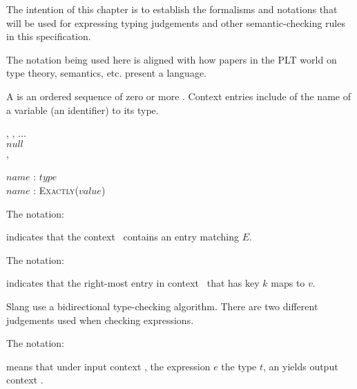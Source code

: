 
\begin{TODO}
The intention of this chapter is to establish the formalisms and notations that will be used for expressing typing judgements and other semantic-checking rules in this specification.

The notation being used here is aligned with how papers in the PLT world on type theory, semantics, etc. present a language.




\end{TODO}


A  is an ordered sequence of zero or more .
Context entries include  of the name of a variable (an identifier) to its type.

\begin{Syntax}
        \ContextVarA, \ContextVarB, ...  \\
        \SynOr $null$  \\
        \SynOr {}, 

        $name$ : $type$  \\
        \SynOr $name$ :  \textsc{Exactly}($value$) 
\end{Syntax}


The notation:
\begin{center}
\end{center}
indicates that the context \ContextVarA\ contains an entry matching $E$.

The notation:
\begin{center}
\end{center}
indicates that the right-most entry in context \ContextVarA\ that has key $k$ maps to $v$.


Slang use a bidirectional type-checking algorithm.
There are two different judgements used when checking expressions.


The notation:
\begin{center}
\end{center}
means that under input context \ContextVarA, the expression $e$  the type $t$, an yields output context \ContextVarB.

